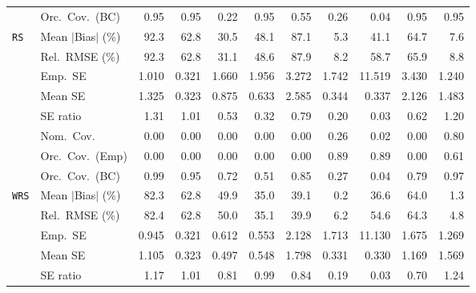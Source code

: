 \begin{landscape}
\begin{longtable}{llrrrrrrrrr}
 & Orc.\ Cov.\ (BC) & \cellcolor{rankone}0.95 & \cellcolor{rankone}0.95 & 0.22 & \cellcolor{rankone}0.95 & \cellcolor{ranktwo}0.55 & \cellcolor{rankthree}0.26 & 0.04 & \cellcolor{rankone}0.95 & \cellcolor{rankone}0.95 \\
\addlinespace[2pt]
\quad \texttt{RS} & Mean $|$Bias$|$ (\%) & 92.3 & 62.8 & \cellcolor{rankthree}30.5 & 48.1 & 87.1 & \cellcolor{rankone}5.3 & 41.1 & 64.7 & \cellcolor{ranktwo}7.6 \\
 & Rel.\ RMSE (\%) & 92.3 & 62.8 & \cellcolor{rankthree}31.1 & 48.6 & 87.9 & \cellcolor{rankone}8.2 & 58.7 & 65.9 & \cellcolor{ranktwo}8.8 \\
 & Emp.\ SE & 1.010 & 0.321 & 1.660 & 1.956 & 3.272 & 1.742 & 11.519 & 3.430 & 1.240 \\
 & Mean SE & 1.325 & 0.323 & 0.875 & 0.633 & 2.585 & 0.344 & 0.337 & 2.126 & 1.483 \\
 & SE ratio & 1.31 & \cellcolor{rankone}1.01 & 0.53 & 0.32 & \cellcolor{rankthree}0.79 & 0.20 & 0.03 & 0.62 & \cellcolor{ranktwo}1.20 \\
 & Nom.\ Cov. & 0.00 & 0.00 & 0.00 & 0.00 & 0.00 & \cellcolor{ranktwo}0.26 & \cellcolor{rankthree}0.02 & 0.00 & \cellcolor{rankone}0.80 \\
 & Orc.\ Cov.\ (Emp) & \cellcolor{rankthree}0.00 & \cellcolor{rankthree}0.00 & \cellcolor{rankthree}0.00 & \cellcolor{rankthree}0.00 & \cellcolor{rankthree}0.00 & \cellcolor{rankone}0.89 & \cellcolor{rankone}0.89 & \cellcolor{rankthree}0.00 & \cellcolor{ranktwo}0.61 \\
 & Orc.\ Cov.\ (BC) & \cellcolor{rankthree}0.99 & \cellcolor{rankone}0.95 & 0.72 & 0.51 & 0.85 & 0.27 & 0.04 & 0.79 & \cellcolor{ranktwo}0.97 \\
\addlinespace[2pt]
\quad \texttt{WRS} & Mean $|$Bias$|$ (\%) & 82.3 & 62.8 & 49.9 & \cellcolor{rankthree}35.0 & 39.1 & \cellcolor{rankone}0.2 & 36.6 & 64.0 & \cellcolor{ranktwo}1.3 \\
 & Rel.\ RMSE (\%) & 82.4 & 62.8 & 50.0 & \cellcolor{rankthree}35.1 & 39.9 & \cellcolor{ranktwo}6.2 & 54.6 & 64.3 & \cellcolor{rankone}4.8 \\
 & Emp.\ SE & 0.945 & 0.321 & 0.612 & 0.553 & 2.128 & 1.713 & 11.130 & 1.675 & 1.269 \\
 & Mean SE & 1.105 & 0.323 & 0.497 & 0.548 & 1.798 & 0.331 & 0.330 & 1.169 & 1.569 \\
 & SE ratio & \cellcolor{rankthree}1.17 & \cellcolor{rankone}1.01 & 0.81 & \cellcolor{rankone}0.99 & \cellcolor{ranktwo}0.84 & 0.19 & 0.03 & 0.70 & 1.24 \\

\end{longtable}
\end{landscape}

